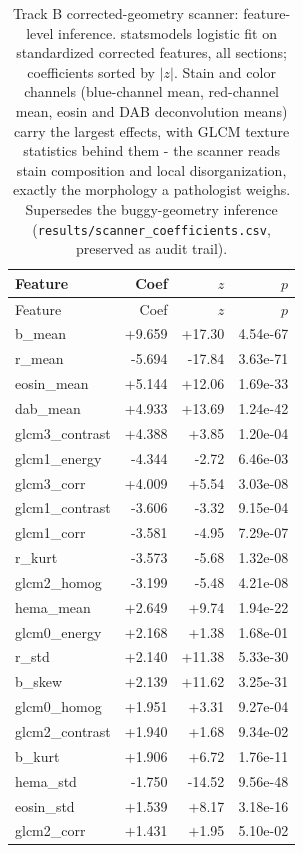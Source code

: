 \begin{longtable}{lrrr}
\caption{Track B corrected-geometry scanner: feature-level inference. statsmodels logistic
fit on standardized corrected features, all sections; coefficients sorted by $|z|$. Stain and
color channels (blue-channel mean, red-channel mean, eosin and DAB deconvolution means) carry
the largest effects, with GLCM texture statistics behind them - the scanner reads stain
composition and local disorganization, exactly the morphology a pathologist weighs. Supersedes
the buggy-geometry inference (\texttt{results/scanner\_coefficients.csv}, preserved as
audit trail).}\label{tab:trackb-v2-coefs}\\
\toprule
Feature & Coef & $z$ & $p$ \\
\midrule
\endfirsthead
\toprule
Feature & Coef & $z$ & $p$ \\
\midrule
\endhead
b\_mean & +9.659 & +17.30 & 4.54e-67 \\
r\_mean & -5.694 & -17.84 & 3.63e-71 \\
eosin\_mean & +5.144 & +12.06 & 1.69e-33 \\
dab\_mean & +4.933 & +13.69 & 1.24e-42 \\
glcm3\_contrast & +4.388 & +3.85 & 1.20e-04 \\
glcm1\_energy & -4.344 & -2.72 & 6.46e-03 \\
glcm3\_corr & +4.009 & +5.54 & 3.03e-08 \\
glcm1\_contrast & -3.606 & -3.32 & 9.15e-04 \\
glcm1\_corr & -3.581 & -4.95 & 7.29e-07 \\
r\_kurt & -3.573 & -5.68 & 1.32e-08 \\
glcm2\_homog & -3.199 & -5.48 & 4.21e-08 \\
hema\_mean & +2.649 & +9.74 & 1.94e-22 \\
glcm0\_energy & +2.168 & +1.38 & 1.68e-01 \\
r\_std & +2.140 & +11.38 & 5.33e-30 \\
b\_skew & +2.139 & +11.62 & 3.25e-31 \\
glcm0\_homog & +1.951 & +3.31 & 9.27e-04 \\
glcm2\_contrast & +1.940 & +1.68 & 9.34e-02 \\
b\_kurt & +1.906 & +6.72 & 1.76e-11 \\
hema\_std & -1.750 & -14.52 & 9.56e-48 \\
eosin\_std & +1.539 & +8.17 & 3.18e-16 \\
glcm2\_corr & +1.431 & +1.95 & 5.10e-02 \\

\end{longtable}
